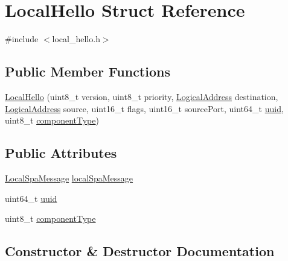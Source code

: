 \hypertarget{structLocalHello}{}\section{Local\+Hello Struct Reference}
\label{structLocalHello}


{\ttfamily \#include $<$local\+\_\+hello.\+h$>$}

\subsection*{Public Member Functions}
\begin{DoxyCompactItemize}
\item 
\hyperlink{structLocalHello_a2ea0d07ccd8786604938da56efaa3144}{Local\+Hello} (uint8\+\_\+t version, uint8\+\_\+t priority, \hyperlink{structLogicalAddress}{Logical\+Address} destination, \hyperlink{structLogicalAddress}{Logical\+Address} source, uint16\+\_\+t flags, uint16\+\_\+t source\+Port, uint64\+\_\+t \hyperlink{structLocalHello_a2793976cc1bea077237bb17c2dbb1713}{uuid}, uint8\+\_\+t \hyperlink{structLocalHello_a1814191cf0ab5e8b281ff3d3f2b455cc}{component\+Type})
\end{DoxyCompactItemize}
\subsection*{Public Attributes}
\begin{DoxyCompactItemize}
\item 
\hyperlink{structLocalSpaMessage}{Local\+Spa\+Message} \hyperlink{structLocalHello_a89f32f528654b416a69c06083fa2c326}{local\+Spa\+Message}
\item 
uint64\+\_\+t \hyperlink{structLocalHello_a2793976cc1bea077237bb17c2dbb1713}{uuid}
\item 
uint8\+\_\+t \hyperlink{structLocalHello_a1814191cf0ab5e8b281ff3d3f2b455cc}{component\+Type}
\end{DoxyCompactItemize}


\subsection{Constructor \& Destructor Documentation}
\mbox{\label{structLocalHello_a2ea0d07ccd8786604938da56efaa3144}} 
